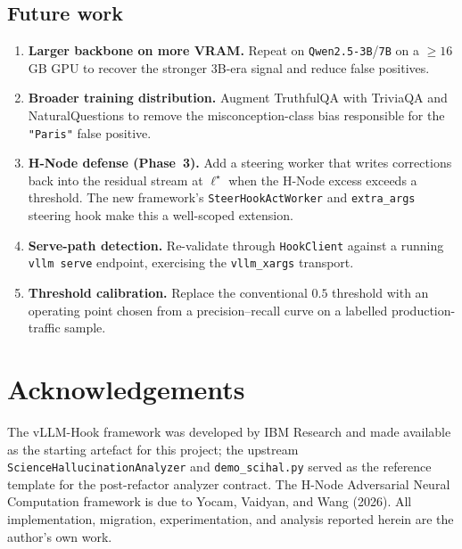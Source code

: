 \documentclass[11pt]{article}
\begin{document}
\subsection{Future work}\label{sec:future}
\begin{enumerate}
  \item \textbf{Larger backbone on more VRAM.} Repeat on \texttt{Qwen2.5-3B}/\texttt{7B} on a
  $\ge 16$\,GB GPU to recover the stronger 3B-era signal and reduce false positives.
  \item \textbf{Broader training distribution.} Augment TruthfulQA with TriviaQA and
  NaturalQuestions to remove the misconception-class bias responsible for the \texttt{"Paris"}
  false positive.
  \item \textbf{H-Node defense (Phase~3).} Add a steering worker that writes corrections back
  into the residual stream at $\ell^\star$ when the H-Node excess exceeds a threshold. The new
  framework's \texttt{SteerHookActWorker} and \texttt{extra\_args} steering hook make this a
  well-scoped extension.
  \item \textbf{Serve-path detection.} Re-validate through \texttt{HookClient} against a
  running \texttt{vllm serve} endpoint, exercising the \texttt{vllm\_xargs} transport.
  \item \textbf{Threshold calibration.} Replace the conventional $0.5$ threshold with an
  operating point chosen from a precision--recall curve on a labelled production-traffic
  sample.
\end{enumerate}

\section*{Acknowledgements}
The vLLM-Hook framework was developed by IBM Research and made available as the starting
artefact for this project; the upstream \texttt{ScienceHallucinationAnalyzer} and
\texttt{demo\_scihal.py} served as the reference template for the post-refactor analyzer
contract. The H-Node Adversarial Neural Computation framework is due to Yocam, Vaidyan, and
Wang (2026). All implementation, migration, experimentation, and analysis reported herein are
the author's own work.
\end{document}
